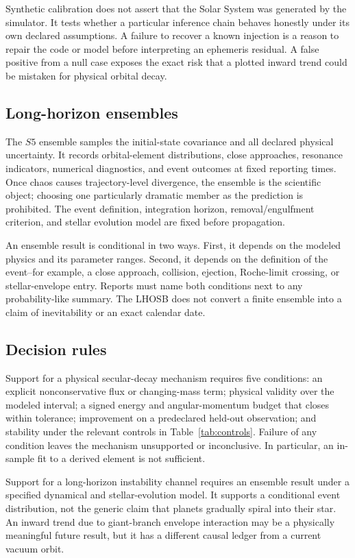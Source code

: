 \documentclass[10pt,conference]{IEEEtran}
\begin{document}
Synthetic calibration does not assert that the Solar System was generated by the simulator. It tests whether a particular inference chain behaves honestly under its own declared assumptions. A failure to recover a known injection is a reason to repair the code or model before interpreting an ephemeris residual. A false positive from a null case exposes the exact risk that a plotted inward trend could be mistaken for physical orbital decay.

\subsection{Long-horizon ensembles}

The $S5$ ensemble samples the initial-state covariance and all declared physical uncertainty. It records orbital-element distributions, close approaches, resonance indicators, numerical diagnostics, and event outcomes at fixed reporting times. Once chaos causes trajectory-level divergence, the ensemble is the scientific object; choosing one particularly dramatic member as the prediction is prohibited. The event definition, integration horizon, removal/engulfment criterion, and stellar evolution model are fixed before propagation.

An ensemble result is conditional in two ways. First, it depends on the modeled physics and its parameter ranges. Second, it depends on the definition of the event--for example, a close approach, collision, ejection, Roche-limit crossing, or stellar-envelope entry. Reports must name both conditions next to any probability-like summary. The LHOSB does not convert a finite ensemble into a claim of inevitability or an exact calendar date.

\subsection{Decision rules}

Support for a physical secular-decay mechanism requires five conditions: an explicit nonconservative flux or changing-mass term; physical validity over the modeled interval; a signed energy and angular-momentum budget that closes within tolerance; improvement on a predeclared held-out observation; and stability under the relevant controls in Table~\ref{tab:controls}. Failure of any condition leaves the mechanism unsupported or inconclusive. In particular, an in-sample fit to a derived element is not sufficient.

Support for a long-horizon instability channel requires an ensemble result under a specified dynamical and stellar-evolution model. It supports a conditional event distribution, not the generic claim that planets gradually spiral into their star. An inward trend due to giant-branch envelope interaction may be a physically meaningful future result, but it has a different causal ledger from a current vacuum orbit.
\end{document}
